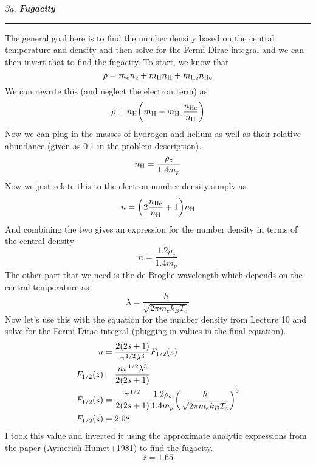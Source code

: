 \documentclass[12pt, letterpaper, twoside]{article}
\newcommand{\question}[1]{{\noindent \it #1}}
\newcommand{\answer}[1]{
    \par\noindent\rule{\textwidth}{0.4pt}#1\vspace{0.5cm}
}
\begin{document}
\question{3a. \textbf{Fugacity}}
\answer{
    The general goal here is to find the number density based on the central temperature and density and then solve for the Fermi-Dirac integral and we can then invert that to find the fugacity. To start, we know that
    \begin{equation}
        \rho = m_e n_e + m_{\rm H} n_{\rm H} + m_{\rm He} n_{\rm He}
    \end{equation}
    We can rewrite this (and neglect the electron term) as
    \begin{equation}
        \rho = n_{\rm H} \qty(m_{\rm H} + m_{\rm He} \frac{n_{\rm He}}{n_{\rm H}})
    \end{equation}
    Now we can plug in the masses of hydrogen and helium as well as their relative abundance (given as 0.1 in the problem description).
    \begin{equation}
        n_{\rm H} = \frac{\rho_c}{1.4 m_p}
    \end{equation}
    Now we just relate this to the electron number density simply as
    \begin{equation}
        n = \qty(2 \frac{n_{\rm He}}{n_{\rm H}} + 1) n_{\rm H}
    \end{equation}
    And combining the two gives an expression for the number density in terms of the central density
    \begin{equation}
        n = \frac{1.2 \rho_c}{1.4 m_p}
    \end{equation}
    The other part that we need is the de-Broglie wavelength which depends on the central temperature as
    \begin{equation}
        \lambda = \frac{h}{\sqrt{2 \pi m_e k_B T_c}}
    \end{equation}
    Now let's use this with the equation for the number density from Lecture 10 and solve for the Fermi-Dirac integral (plugging in values in the final equation).
    \begin{align}
        n &= \frac{2(2s + 1)}{\pi^{1/2} \lambda^3} F_{1/2}(z) \\
        F_{1/2}(z) &= \frac{n \pi^{1/2} \lambda^3}{2(2s + 1)} \\
        F_{1/2}(z) &= \frac{\pi^{1/2}}{2(2s + 1)} \frac{1.2 \rho_c}{1.4 m_p} \qty(\frac{h}{\sqrt{2 \pi m_e k_B T_c}})^3 \\
        F_{1/2}(z) &= 2.08
    \end{align}
    I took this value and inverted it using the approximate analytic expressions from the paper (Aymerich-Humet+1981) to find the fugacity.
    \begin{equation}
        \boxed{ z = 1.65 }
    \end{equation}
}
\end{document}
